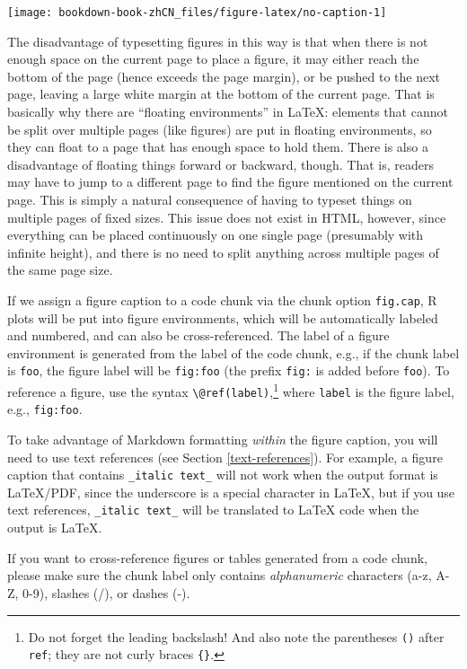 \documentclass[
  12pt,
]{krantz}
\makeatletter
\newenvironment{kframe}{%
\medskip{}
\setlength{\fboxsep}{.8em}
 \def\at@end@of@kframe{}%
 \ifinner\ifhmode%
  \def\at@end@of@kframe{\end{minipage}}%
  \begin{minipage}{\columnwidth}%
 \fi\fi%
 \def\FrameCommand##1{\hskip\@totalleftmargin \hskip-\fboxsep
 \colorbox{shadecolor}{##1}\hskip-\fboxsep
     \hskip-\linewidth \hskip-\@totalleftmargin \hskip\columnwidth}%
 \MakeFramed {\advance\hsize-\width
   \@totalleftmargin\z@ \linewidth\hsize
   \@setminipage}}%
 {\par\unskip\endMakeFramed%
 \at@end@of@kframe}
\newenvironment{rmdblock}[1]
  {
  \begin{itemize}
  \renewcommand{\labelitemi}{
    \raisebox{-.7\height}[0pt][0pt]{
      {\setkeys{Gin}{width=3em,keepaspectratio}\texttt{[image: images/\#1]}}
    }
  }
  \setlength{\fboxsep}{1em}
  \begin{kframe}
  \item
  }
  {
  \end{kframe}
  \end{itemize}
  }
\newenvironment{rmdimportant}
  {\begin{rmdblock}{important}}
  {\end{rmdblock}}
\theoremstyle{definition}
\theoremstyle{definition}
\theoremstyle{definition}
\theoremstyle{definition}
\theoremstyle{remark}
\makeatother
\begin{document}
\texttt{[image: bookdown-book-zhCN\_files/figure-latex/no-caption-1]}

The disadvantage of typesetting figures in this way is that when there is not enough space on the current page to place a figure, it may either reach the bottom of the page (hence exceeds the page margin), or be pushed to the next page, leaving a large white margin at the bottom of the current page. That is basically why there are ``floating environments'' in LaTeX: elements that cannot be split over multiple pages (like figures) are put in floating environments, so they can float to a page that has enough space to hold them. There is also a disadvantage of floating things forward or backward, though. That is, readers may have to jump to a different page to find the figure mentioned on the current page. This is simply a natural consequence of having to typeset things on multiple pages of fixed sizes. This issue does not exist in HTML, however, since everything can be placed continuously on one single page (presumably with infinite height), and there is no need to split anything across multiple pages of the same page size.

If we assign a figure caption to a code chunk via the chunk option \texttt{fig.cap}, R plots will be put into figure environments, which will be automatically labeled and numbered, and can also be cross-referenced. The label of a figure environment is generated from the label of the code chunk, e.g., if the chunk label is \texttt{foo}, the figure label will be \texttt{fig:foo} (the prefix \texttt{fig:} is added before \texttt{foo}). To reference a figure, use the syntax \texttt{\textbackslash{}@ref(label)},\footnote{Do not forget the leading backslash! And also note the parentheses \texttt{()} after \texttt{ref}; they are not curly braces \texttt{\{\}}.} where \texttt{label} is the figure label, e.g., \texttt{fig:foo}.

To take advantage of Markdown formatting \emph{within} the figure caption, you will need to use text references (see Section \ref{text-references}). For example, a figure caption that contains \texttt{\_italic\ text\_} will not work when the output format is LaTeX/PDF, since the underscore is a special character in LaTeX, but if you use text references, \texttt{\_italic\ text\_} will be translated to LaTeX code when the output is LaTeX.

\begin{rmdimportant}
If you want to cross-reference figures or tables generated from a code chunk, please make sure the chunk label only contains \emph{alphanumeric} characters (a-z, A-Z, 0-9), slashes (/), or dashes (-).
\end{rmdimportant}
\end{document}
